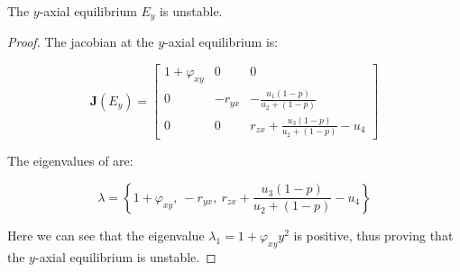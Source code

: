 \begin{theorem}\label{thm:eq-axial-y-stability}
    The $y$-axial equilibrium $E_y$ is unstable.
\end{theorem}
\begin{proof}
    The jacobian at the $y$-axial equilibrium is:

    \begin{equation}\label{matrix:jacobian-axial-y}
        \textbf{J}\left(E_y\right) = \begin{bmatrix}
            1+\varphi_{xy} & 0 & 0\\
            0 & -r_{yx} & -\frac{u_1\left(1-p\right)}{u_2+\left(1-p\right)}\\
            0 & 0 & r_{zx}+\frac{u_3\left(1-p\right)}{u_2+\left(1-p\right)}-u_4
        \end{bmatrix}
    \end{equation}

    The eigenvalues of  are:
    
    \begin{equation*}
        \lambda=\left\{1+\varphi_{xy},\ -r_{yx},\ r_{zx}+\frac{u_3\left(1-p\right)}{u_2+\left(1-p\right)}-u_4\right\}
    \end{equation*}
    
    Here we can see that the eigenvalue $\lambda_1=1+\varphi_{xy}y^2$ is positive, thus proving that the $y$-axial equilibrium is unstable.
\end{proof}


